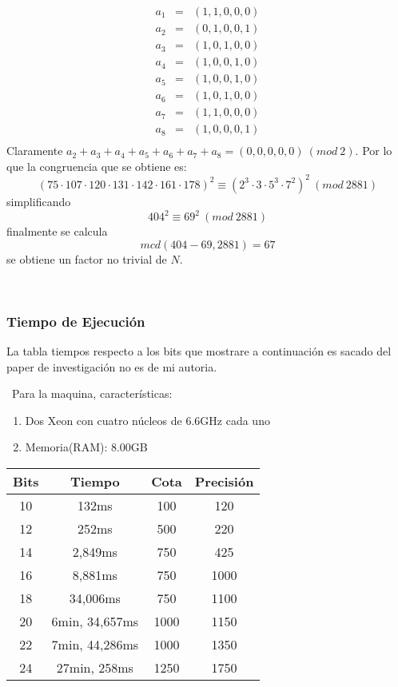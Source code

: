 \documentclass[11pt, conference]{IEEEtran}
\begin{document}
\[
\begin{array}{ccc}
a_1 & = & (1,1,0,0,0) \\
a_2 & = & (0,1,0,0,1) \\
a_3 & = & (1,0,1,0,0) \\
a_4 & = & (1,0,0,1,0) \\
a_5 & = & (1,0,0,1,0) \\
a_6 & = & (1,0,1,0,0) \\
a_7 & = & (1,1,0,0,0) \\
a_8 & = & (1,0,0,0,1) \\
\end{array}
\]
Claramente $a_2 +a_3 +a_4 +a_5 +a_6 +a_7 +a_8 = (0, 0, 0, 0, 0)\ (mod\ 2)$. Por lo que la congruencia que se obtiene es:
\[(75\cdot107\cdot120\cdot131\cdot142\cdot161\cdot178)^2\equiv(2^3\cdot3\cdot5^3\cdot7^2)^2\ (mod\ 2881)\]
simplificando
\[404^2\equiv69^2\ (mod\ 2881)\]
finalmente se calcula
\[mcd(404-69,2881) = 67\]
se obtiene un factor no trivial de $N$.

\


\pagebreak
\subsubsection[Tiempo de Ejecución]{\textbf{Tiempo de Ejecución}}
La tabla tiempos respecto a los bits que mostrare a continuación es sacado del paper de investigación no es de mi autoria. 
\cite{a}

\
Para la maquina, características:
\begin{enumerate}
	\item Dos Xeon con cuatro núcleos de 6.6GHz cada uno
	\item Memoria(RAM): 8.00GB
\end{enumerate}
\begin{table}[htb]
	\begin{center}
		\begin{tabular}{|c|c|c|c|}
			\hline
			Bits&Tiempo&Cota&Precisión\\
			\hline
			10&132ms&100&120\\
			\hline
			12&252ms&500&220\\
			\hline
			14&2,849ms&750&425\\
			\hline
			16&8,881ms&750&1000\\
			\hline
			18&34,006ms&750&1100\\
			\hline
			20&6min, 34,657ms&1000&1150\\
			\hline
			22&7min, 44,286ms&1000&1350\\
			\hline
			24&27min, 258ms&1250&1750\\
			\hline
		\end{tabular}
	\end{center}
\end{table}
\end{document}
